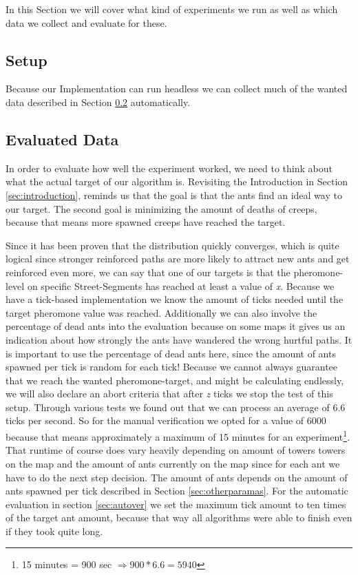 In this Section we will cover what kind of experiments we run as well as which data we collect and evaluate for these.

\subsection{Setup}

Because our Implementation can run headless we can collect much of the wanted data described in Section \ref{sec:experimentevdata} automatically. 

\subsection{Evaluated Data}
\label{sec:experimentevdata}

In order to evaluate how well the experiment worked, we need to think about what the actual target of our algorithm is. Revisiting the Introduction in Section \ref{sec:introduction}, reminds us that the goal is that the ants find an ideal way to our target. The second goal is minimizing the amount of deaths of creeps, because that means more spawned creeps have reached the target.


Since it has been proven that the distribution quickly converges\cite[P. 15]{maniezzo2002ant}, which is quite logical since stronger reinforced paths are more likely to attract new ants and get reinforced even more, we can say that one of our targets is that the pheromone-level on specific Street-Segments has reached at least a value of \textit{x}.
Because we have a tick-based implementation we know the amount of ticks needed until the target pheromone value was reached. Additionally we can also involve the percentage of dead ants into the evaluation because on some maps it gives us an indication about how strongly the ants have wandered  the wrong hurtful paths. It is important to use the percentage of dead ants here, since the amount of ants spawned per tick is random for each tick!
Because we cannot always guarantee that we reach the wanted pheromone-target, and might be calculating endlessly, we will also declare an abort criteria that after \textit{z} ticks we stop the test of this setup. Through various tests we found out that we can process an average of 6.6 ticks per second. So for the manual verification we opted for a value of 6000 because that means approximately a maximum of 15 minutes for an experiment\footnote{15 minutes = 900 sec  $\Rightarrow 900 * 6.6 = 5940$}. That runtime of course does vary heavily depending on amount of towers towers on the map and the amount of ants currently on the map since for each ant we have to do the next step decision. The amount of ants depends on the amount of ants spawned per tick described in Section \ref{sec:otherparamas}.
For the automatic evaluation in section \ref{sec:autover} we set the maximum tick amount to ten times of the target ant amount, because that way all algorithms were able to finish even if they took quite long. 


